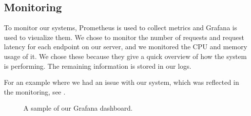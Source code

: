 \subsection{Monitoring}
To monitor our systems, Prometheus is used to collect metrics and Grafana is used to visualize them. We chose to monitor the number of requests and request latency for each endpoint on our server, and we monitored the CPU and memory usage of it. We chose these because they give a quick overview of how the system is performing. The remaining information is stored in our logs.

For an example where we had an issue with our system, which was reflected in the monitoring, see .

\begin{figure}[H]
    \caption{A sample of our Grafana dashboard.}
\end{figure}
